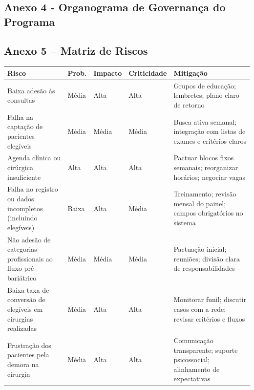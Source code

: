 \documentclass[12pt]{article}
\begin{document}
\subsection{Anexo 4 - Organograma de Governança do Programa}
\label{sec:org802890a}
\begin{center}

\label{orgcec66a9}
\end{center}

\FGVNewPage
\subsection{Anexo 5 – Matriz de Riscos}
\label{sec:orgd50cfb2}
\begin{table}[htbp]
\centering
\scriptsize
\setlength{\tabcolsep}{2pt}
\begin{tabularx}{\textwidth}{%
>{\raggedright\arraybackslash}X
>{\centering\arraybackslash}m{}
>{\centering\arraybackslash}m{}
>{\centering\arraybackslash}m{}
>{\raggedright\arraybackslash}X}
\toprule
Risco                                                          & Prob. & Impacto & Criticidade & Mitigação                                                                   \\
\midrule
Baixa adesão às consultas                                      & Média & Alta    & Alta        & Grupos de educação; lembretes; plano claro de retorno                       \\
Falha na captação de pacientes elegíveis                       & Média & Média   & Média       & Busca ativa semanal; integração com listas de exames e critérios claros     \\
Agenda clínica ou cirúrgica insuficiente                       & Alta  & Alta    & Alta        & Pactuar blocos fixos semanais; reorganizar horários; negociar vagas         \\
Falha no registro ou dados incompletos (incluindo elegíveis)   & Baixa & Alta    & Média       & Treinamento; revisão mensal do painel; campos obrigatórios no sistema       \\
Não adesão de categorias profissionais ao fluxo pré-bariátrico & Média & Média   & Média       & Pactuação inicial; reuniões; divisão clara de responsabilidades             \\
Baixa taxa de conversão de elegíveis em cirurgias realizadas   & Média & Alta    & Alta        & Monitorar funil; discutir casos com a rede; revisar critérios e fluxos      \\
Frustração dos pacientes pela demora na cirurgia               & Média & Alta    & Alta        & Comunicação transparente; suporte psicossocial; alinhamento de expectativas \\
\bottomrule
\end{tabularx}
\normalsize
\label{tab:riscos}
\end{table}
\end{document}
